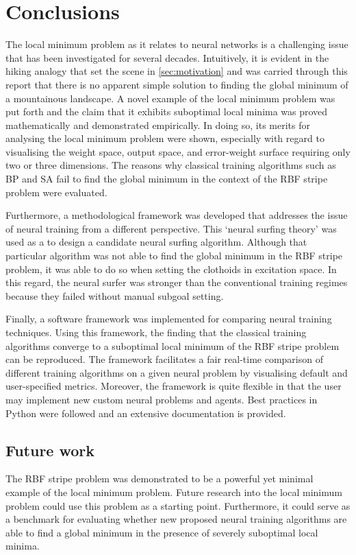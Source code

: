 \chapter{Conclusions}
The local minimum problem as it relates to neural networks is a challenging issue that has been investigated for several decades.
Intuitively, it is evident in the hiking analogy that set the scene in \ref{sec:motivation} and was carried through this report that there is no apparent simple solution to finding the global minimum of a mountainous landscape.
A novel example of the local minimum problem was put forth and the claim that it exhibits suboptimal local minima was proved mathematically and demonstrated empirically.
In doing so, its merits for analysing the local minimum problem were shown, especially with regard to visualising the weight space, output space, and error-weight surface requiring only two or three dimensions.
The reasons why classical training algorithms such as BP and SA fail to find the global minimum in the context of the RBF stripe problem were evaluated.

Furthermore, a methodological framework was developed that addresses the issue of neural training from a different perspective.
This `neural surfing theory' was used as a to design a candidate neural surfing algorithm.
Although that particular algorithm was not able to find the global minimum in the RBF stripe problem, it was able to do so when setting the clothoids in excitation space.
In this regard, the neural surfer was stronger than the conventional training regimes because they failed without manual subgoal setting.

Finally, a software framework was implemented for comparing neural training techniques.
Using this framework, the finding that the classical training algorithms converge to a suboptimal local minimum of the RBF stripe problem can be reproduced.
The framework facilitates a fair real-time comparison of different training algorithms on a given neural problem by visualising default and user-specified metrics.
Moreover, the framework is quite flexible in that the user may implement new custom neural problems and agents.
Best practices in Python were followed and an extensive documentation is provided.

\section{Future work}
\label{sec:future_work}
The RBF stripe problem was demonstrated to be a powerful yet minimal example of the local minimum problem. 
Future research into the local minimum problem could use this problem as a starting point.
Furthermore, it could serve as a benchmark for evaluating whether new proposed neural training algorithms are able to find a global minimum in the presence of severely suboptimal local minima.

